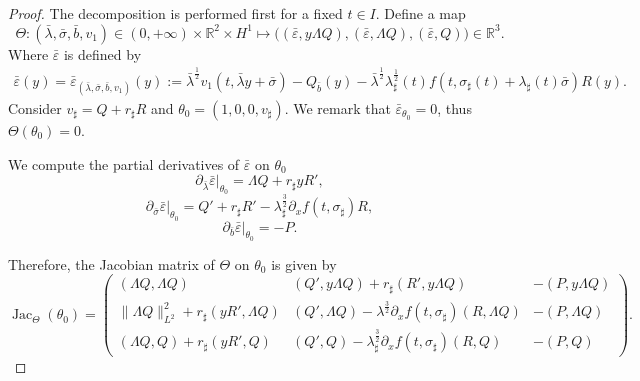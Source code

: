 \documentclass[16pt,english, oneside,reqno]{smfart}
\newcommand{\RR}{\mathbb{R}}
\newcommand{\vare}{{\varepsilon}}
\DeclareMathOperator{\Jac}{Jac}
\begin{document}
\begin{proof}
    The decomposition is performed first for a fixed $t \in I$. Define a map
    \begin{equation}
        \Theta: (\bar{\lambda}, \bar{\sigma}, \bar{b}, v_1)\in (0,+\infty)\times \RR^2\times H^1 \mapsto \big((\bar{\vare},y\Lambda Q), (\bar{\vare}, \Lambda Q), (\bar{\vare}, Q) \big) \in \RR^3.
    \end{equation}
Where $\bar{\vare}$ is defined by
\begin{equation}
    \begin{split}
        \bar{\vare}(y)= \bar{\vare}_{(\bar{\lambda}, \bar{\sigma}, \bar{b}, v_1)}(y):= \bar{\lambda}^{\frac{1}{2}}v_1(t, \bar{\lambda }y + \bar{\sigma}) - Q_{\bar{b}}(y)-\bar{\lambda}^{\frac{1}{2}} \lambda_{\sharp}^{\frac{1}{2}}(t)f(t,\sigma_{\sharp}(t)+\lambda_{\sharp}(t)\bar{\sigma})R(y).
    \end{split}
\end{equation}
Consider $v_{\sharp}= Q+r_{\sharp}R$ and $\theta_0 = (1,0,0,v_{\sharp})$. We remark that $\bar{\vare}_{\theta_0}= 0$, thus $\Theta(\theta_0)=0$.

We compute the partial derivatives of $\bar{\vare}$ on $\theta_0$
\begin{equation}
    \partial_{\bar{\lambda}} \bar{\vare}\vert_{\theta_0} = \Lambda Q + r_{\sharp}y R',
\end{equation}
\begin{equation}
    \partial_{\bar{\sigma}} \bar{\vare}\vert_{\theta_0} = Q'+ r_{\sharp}R' - \lambda^{\frac{3}{2}}_{\sharp} \partial_x f(t,\sigma_{\sharp})R,
\end{equation}
\begin{equation}
    \partial_{\bar{b}} \bar{\vare}\vert_{\theta_0} = -P.
\end{equation}

Therefore, the Jacobian matrix of $\Theta$ on $\theta_0$ is given by
\begin{equation}
        \Jac_{\Theta}(\theta_0) = 
        \begin{pmatrix}
(\Lambda Q, \Lambda Q) & (Q', y\Lambda Q) + r_{\sharp}(R', y\Lambda Q) & -(P,y\Lambda Q)\\
\|\Lambda Q\|^2_{L^2}+r_{\sharp}(yR',\Lambda Q) & (Q', \Lambda Q)- \lambda^{\frac{3}{2}}\partial_x f(t, \sigma_{\sharp})(R, \Lambda Q) & -(P,\Lambda Q)\\
(\Lambda Q, Q)+ r_{\sharp}(y R', Q) & (Q',Q)- \lambda^{\frac{3}{2}}_{\sharp} \partial_x f(t, \sigma_{\sharp})(R,Q) & -(P,Q)
\end{pmatrix}.
\end{equation}


\end{proof}
\end{document}
